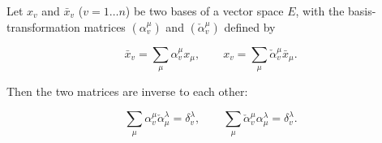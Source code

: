 Let $x_v$ and $\bar{x}_v$ ($v = 1 \ldots n$) be two bases of a vector space $E$, with the basis-transformation matrices $(\alpha_v^\mu)$ and $(\check{\alpha}_v^\mu)$ defined by

$$\bar{x}_v = \sum_{\mu} \alpha_v^\mu x_\mu, \qquad x_v = \sum_{\mu} \check{\alpha}_v^\mu \bar{x}_\mu.$$

Then the two matrices are inverse to each other:

$$\sum_{\mu} \alpha_v^\mu \check{\alpha}_\mu^\lambda = \delta_v^\lambda, \qquad \sum_{\mu} \check{\alpha}_v^\mu \alpha_\mu^\lambda = \delta_v^\lambda.$$
